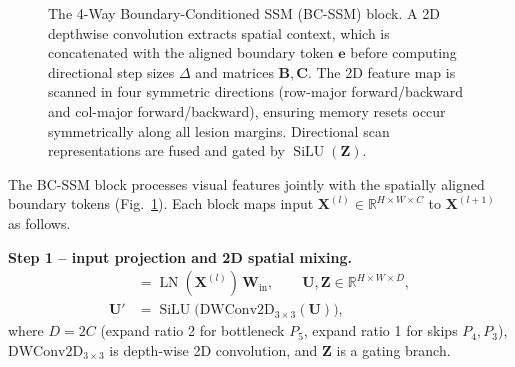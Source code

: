 \documentclass[journal]{IEEEtran}
\newcommand{\R}{\mathbb{R}}
\newcommand{\vect}[1]{\bm{#1}}
\newcommand{\SiLU}{\operatorname{SiLU}}
\newcommand{\LN}{\operatorname{LN}}
\newcommand{\Dt}{\Delta}
\begin{document}
\begin{figure}[t]
{}
\caption{The 4-Way Boundary-Conditioned SSM (BC-SSM) block. A 2D depthwise convolution extracts spatial context, which is concatenated with the aligned boundary token $\vect{e}$ before computing directional step sizes $\Dt$ and matrices $\vect{B},\vect{C}$. The 2D feature map is scanned in four symmetric directions (row-major forward/backward and col-major forward/backward), ensuring memory resets occur symmetrically along all lesion margins. Directional scan representations are fused and gated by $\SiLU(\vect{Z})$.}
\label{fig:block}
\end{figure}

The BC-SSM block processes visual features jointly with the spatially aligned boundary tokens (Fig.~\ref{fig:block}). Each block maps input $\vect{X}^{(l)}\in\R^{H\times W\times C}$ to $\vect{X}^{(l+1)}$ as follows.

\textbf{Step 1 -- input projection and 2D spatial mixing.}
\begin{align}
  [\vect{U};\vect{Z}] &= \LN(\vect{X}^{(l)})\,\vect{W}_{\text{in}}, \qquad \vect{U},\vect{Z}\in\R^{H\times W\times D}, \label{eq:inproj}\\
  \vect{U}' &= \SiLU\big(\mathrm{DWConv2D}_{3\times3}(\vect{U})\big), \label{eq:conv}
\end{align}
where $D=2C$ (expand ratio 2 for bottleneck $P_5$, expand ratio 1 for skips $P_4,P_3$), $\mathrm{DWConv2D}_{3\times3}$ is depth-wise 2D convolution, and $\vect{Z}$ is a gating branch.
\end{document}

